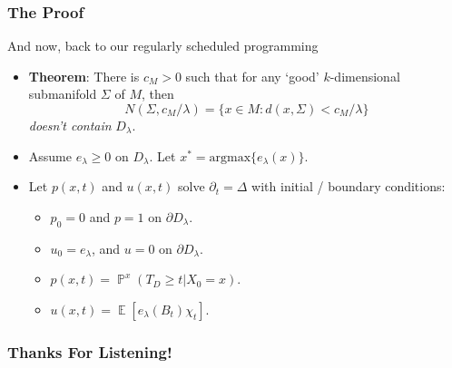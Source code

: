 \documentclass[usenames,dvipsnames,12pt]{beamer}
\DeclareMathOperator{\PP}{\mathbb{P}}
\DeclareMathOperator{\EE}{\mathbb{E}}
\begin{document}
\begin{frame}
    \frametitle{The Proof}

    And now, back to our regularly scheduled programming

    \begin{itemize}
        \item {\bf Theorem}: There is $c_M > 0$ such that for any `good' $k$-dimensional submanifold $\Sigma$ of $M$, then
        \[ N(\Sigma, c_M / \lambda) = \{ x \in M : d(x,\Sigma) < c_M / \lambda \} \]
        \emph{doesn't contain} $D_\lambda$.

        \pause
        \item Assume $e_\lambda \geq 0$ on $D_\lambda$. Let $x^* = \text{argmax} \{ e_\lambda(x) \}$.

        \pause
        \item Let $p(x,t)$ and $u(x,t)$ solve $\partial_t = \Delta$ with initial / boundary conditions:
        \begin{itemize}
            \item $p_0 = 0$ and $p = 1$ on $\partial D_\lambda$.
            \item $u_0 = e_\lambda$, and $u = 0$ on $\partial D_\lambda$.

            \pause
            \item $p(x,t) = \PP^x(T_D \geq t | X_0 = x)$.
            \item $u(x,t) = \EE[e_\lambda(B_t) \chi_t]$.
        \end{itemize}




    \end{itemize}
\end{frame}

\begin{frame}
    \frametitle{Thanks For Listening!}
\end{frame}

\end{document}
